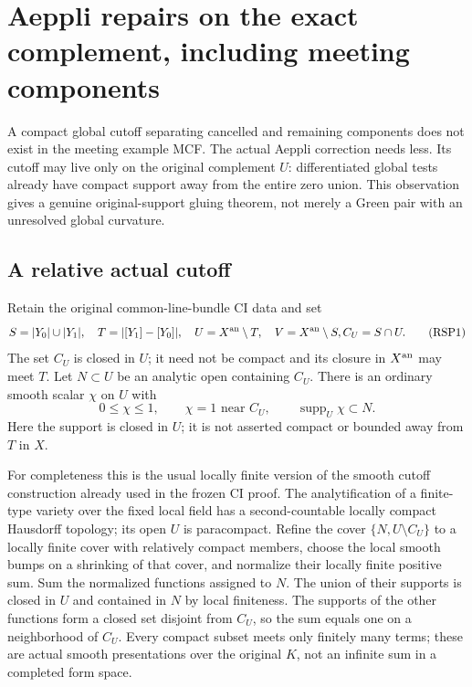 \section{Aeppli repairs on the exact complement, including meeting components}
\label{sec:r9-relative-support-aeppli-patch}

A compact global cutoff separating cancelled and remaining
components does not exist in the meeting example MCF.
The actual Aeppli correction needs less.  Its cutoff may
live only on the original complement $U$: differentiated
global tests already have compact support away from the
entire zero union.  This observation gives a genuine
original-support gluing theorem, not merely a Green pair
with an unresolved global curvature.

\subsection{A relative actual cutoff}

Retain the original common-line-bundle CI data and set
\[
 S=|Y_0|\cup|Y_1|,\quad T=|[Y_1]-[Y_0]|,\quad
 U=X^{\rm an}\setminus T,\quad V=X^{\rm an}\setminus S,
                         C_U=S\cap U.
 \tag{RSP1}
\]
The set $C_U$ is closed in $U$; it need not be compact
and its closure in $X^{\rm an}$ may meet $T$.
Let $N\subset U$ be an analytic open containing $C_U$.
There is an ordinary smooth scalar $\chi$ on $U$ with
\[
            0\le\chi\le1,\qquad
            \chi=1\text{ near }C_U,\qquad
            \operatorname{supp}_U\chi\subset N.
 \tag{RSP2}
\]
Here the support is closed in $U$; it is not asserted
compact or bounded away from $T$ in $X$.

For completeness this is the usual locally finite
version of the smooth cutoff construction already
used in the frozen CI proof.  The analytification of
a finite-type variety over the fixed local field has
a second-countable locally compact Hausdorff topology;
its open $U$ is paracompact.  Refine the cover
$\{N,U\setminus C_U\}$ to a locally finite cover
with relatively compact members, choose the local
smooth bumps on a shrinking of that cover, and
normalize their locally finite positive sum.
Sum the normalized functions assigned to $N$.
The union of their supports is closed in $U$ and
contained in $N$ by local finiteness.  The supports
of the other functions form a closed set disjoint
from $C_U$, so the sum equals one on a neighborhood
of $C_U$.  Every compact subset meets only finitely
many terms; these are actual smooth presentations
over the original $K$, not an infinite sum in a
completed form space.

